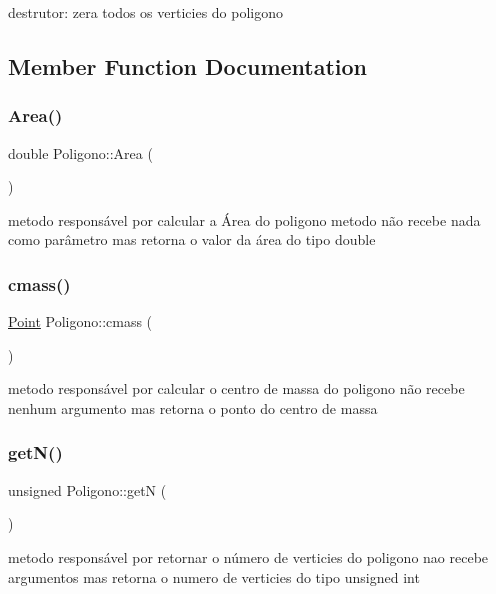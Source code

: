 destrutor\+: zera todos os verticies do poligono 

\subsection{Member Function Documentation}
\mbox{\label{classPoligono_a76e434d95055f6c94fdcf3c314d44be0}} 
\subsubsection{\texorpdfstring{Area()}{Area()}}
{\footnotesize\ttfamily double Poligono\+::\+Area (\begin{DoxyParamCaption}{ }\end{DoxyParamCaption})}

metodo responsável por calcular a Área do poligono metodo não recebe nada como parâmetro mas retorna o valor da área do tipo double \mbox{\label{classPoligono_a9f5148c45bc074be28664efc717e5968}} 
\subsubsection{\texorpdfstring{cmass()}{cmass()}}
{\footnotesize\ttfamily \hyperlink{classPoint}{Point} Poligono\+::cmass (\begin{DoxyParamCaption}{ }\end{DoxyParamCaption})}

metodo responsável por calcular o centro de massa do poligono não recebe nenhum argumento mas retorna o ponto do centro de massa \mbox{\label{classPoligono_abb6eef3e304cb28501356fd5512b0890}} 
\subsubsection{\texorpdfstring{get\+N()}{getN()}}
{\footnotesize\ttfamily unsigned Poligono\+::getN (\begin{DoxyParamCaption}{ }\end{DoxyParamCaption})\hspace{0.3cm}{\ttfamily [inline]}}

metodo responsável por retornar o número de verticies do poligono nao recebe argumentos mas retorna o numero de verticies do tipo unsigned int \mbox{\label{classPoligono_a8c696d750b78769e9b2e04790dac9195}} 
